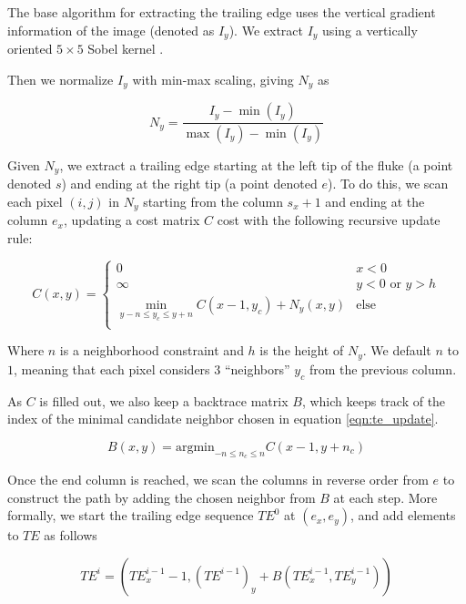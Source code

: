 The base algorithm for extracting the trailing edge uses the vertical gradient information of the image (denoted as $I_y$).
We extract $I_y$ using a vertically oriented $5 \times 5$ Sobel kernel \cite{Sobel1968}.  

Then we normalize $I_y$ with min-max scaling, giving $N_y$ as

\begin{equation} \label{eqn:norm01}
N_{y} = \frac{I_y - \min(I_y)}{\max(I_y) - \min(I_y)}
\end{equation}

Given $N_y$, we extract a trailing edge starting at the left tip of the fluke (a point denoted $s$) and ending at the right tip (a point denoted $e$).
To do this, we scan each pixel $(i,j)$ in $N_y$ starting from the column $s_x + 1$ and ending at the column $e_x$, updating a cost matrix $C$ cost with the following recursive update rule:

\begin{equation} \label{eqn:te_update}
C(x,y) = 
\begin{cases}
	0 & x < 0 \\
	\infty & y < 0 \text{ or } y > h \\
	\min_{y - n \leq y_c \leq y + n}C(x-1, y_c) + N_y(x,y) & \text{else} \\
\end{cases}
\end{equation}

Where $n$ is a neighborhood constraint and $h$ is the height of $N_y$.  
We default $n$ to $1$, meaning that each pixel considers $3$ ``neighbors'' $y_c$ from the previous column.

As $C$ is filled out, we also keep a backtrace matrix $B$, which keeps track of the index of the minimal candidate neighbor chosen in equation \eqref{eqn:te_update}.

\begin{equation} \label{eqn:backtrace_update}
	B(x,y) = \text{argmin}_{-n \leq n_c \leq n} C(x-1, y+n_c)
\end{equation}

Once the end column is reached, we scan the columns in reverse order from $e$ to construct the path by adding the chosen neighbor from $B$ at each step.
More formally, we start the trailing edge sequence $TE^0$ at $(e_x, e_y)$, and add elements to $TE$ as follows

\begin{equation} \label{eqn:te_build}
	TE^i = (TE^{i-1}_x - 1, (TE^{i-1})_y + B(TE^{i-1}_x,TE^{i-1}_y))
\end{equation}

